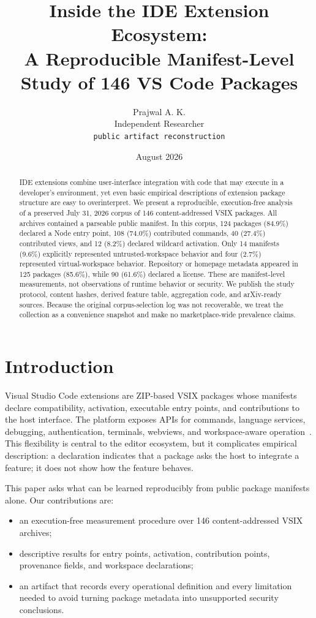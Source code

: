 \documentclass[10pt,twocolumn]{article}
\title{Inside the IDE Extension Ecosystem:\\A Reproducible Manifest-Level Study of 146 VS Code Packages}
\author{Prajwal A. K.\\Independent Researcher\\\texttt{public artifact reconstruction}}
\date{August 2026}
\newcommand{\pct}[1]{#1\%}
\begin{document}
\maketitle

\begin{abstract}
IDE extensions combine user-interface integration with code that may execute in a developer's environment, yet even basic empirical descriptions of extension package structure are easy to overinterpret. We present a reproducible, execution-free analysis of a preserved July 31, 2026 corpus of 146 content-addressed VSIX packages. All archives contained a parseable public manifest. In this corpus, 124 packages (\pct{84.9}) declared a Node entry point, 108 (\pct{74.0}) contributed commands, 40 (\pct{27.4}) contributed views, and 12 (\pct{8.2}) declared wildcard activation. Only 14 manifests (\pct{9.6}) explicitly represented untrusted-workspace behavior and four (\pct{2.7}) represented virtual-workspace behavior. Repository or homepage metadata appeared in 125 packages (\pct{85.6}), while 90 (\pct{61.6}) declared a license. These are manifest-level measurements, not observations of runtime behavior or security. We publish the study protocol, content hashes, derived feature table, aggregation code, and arXiv-ready sources. Because the original corpus-selection log was not recoverable, we treat the collection as a convenience snapshot and make no marketplace-wide prevalence claims.
\end{abstract}

\section{Introduction}
Visual Studio Code extensions are ZIP-based VSIX packages whose manifests declare compatibility, activation, executable entry points, and contributions to the host interface. The platform exposes APIs for commands, language services, debugging, authentication, terminals, webviews, and workspace-aware operation~\cite{vscode-anatomy,vscode-activation,vscode-capabilities}. This flexibility is central to the editor ecosystem, but it complicates empirical description: a declaration indicates that a package asks the host to integrate a feature; it does not show how the feature behaves.

This paper asks what can be learned reproducibly from public package manifests alone. Our contributions are:
\begin{itemize}
  \item an execution-free measurement procedure over 146 content-addressed VSIX archives;
  \item descriptive results for entry points, activation, contribution points, provenance fields, and workspace declarations;
  \item an artifact that records every operational definition and every limitation needed to avoid turning package metadata into unsupported security conclusions.
\end{itemize}
\end{document}
